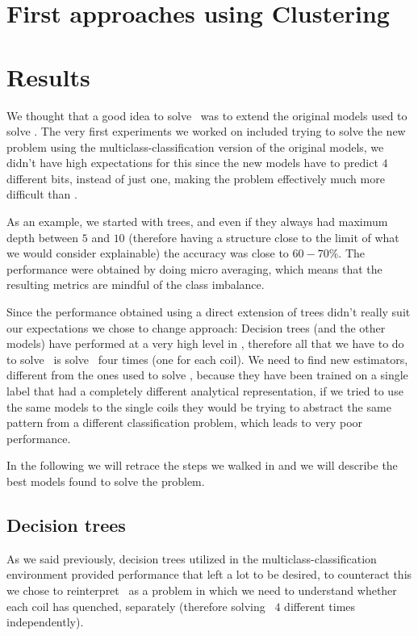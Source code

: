 \section{First approaches using Clustering}

\section{Results}
We thought that a good idea to solve \qlp\ was to extend the original models used to solve \qrp. The
very first experiments we worked on included trying to solve the new problem using the
multiclass-classification version of the original models, we didn't have high expectations for this
since the new models have to predict $4$ different bits, instead of just one, making the problem
effectively much more difficult than \qrp.

As an example, we started with trees, and even if they always had maximum depth between $5$ and $10$
(therefore having a structure close to the limit of what we would consider explainable) the accuracy
was close to $60 - 70\%$. The performance were obtained by doing micro averaging, which means that
the resulting metrics are mindful of the class imbalance.

Since the performance obtained using a direct extension of trees didn't really suit our expectations
we chose to change approach: Decision trees (and the other models) have performed at a very high
level in \qrp, therefore all that we have to do to solve \qlp\ is solve \qrp\ four times (one for
each coil). We need to find new estimators, different from the ones used to solve \qrp, because they
have been trained on a single label that had a completely different analytical representation, if we
tried to use the same models to the single coils they would be trying to abstract the same pattern
from a different classification problem, which leads to very poor performance.

In the following we will retrace the steps we walked in  and we will describe the best
models found to solve the problem.

\subsection{Decision trees}
As we said previously, decision trees utilized in the multiclass-classification environment provided
performance that left a lot to be desired, to counteract this we chose to reinterpret \qlp\ as a
problem in which we need to understand whether each coil has quenched, separately (therefore
solving \qrp\ $4$ different times independently).

